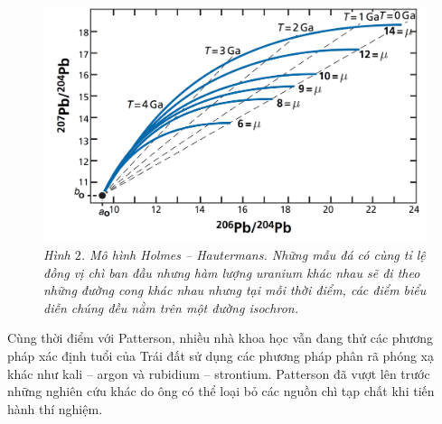 \begin{multicols}{2}
	\begin{figure}[H]
		\vspace*{-5pt}
		\centering
		\captionsetup{labelformat= empty, justification=centering}
		\includegraphics[width= 1\linewidth]{2}
		\caption{\small\textit{\color{timhieukhoahoc}Hình $2$. Mô hình Holmes -- Hautermans. Những mẫu đá có cùng tỉ lệ đồng vị chì ban đầu nhưng hàm lượng uranium khác nhau sẽ đi theo những đường cong khác nhau nhưng tại mỗi thời điểm, các điểm biểu diễn chúng đều nằm trên một đường isochron.}}
	\end{figure}	
	Cùng thời điểm với Patterson, nhiều nhà khoa học vẫn đang thử các phương pháp xác định tuổi của Trái đất sử dụng các phương pháp phân rã phóng xạ khác như kali -- argon và rubidium -- strontium. Patterson đã vượt lên trước những nghiên cứu khác do ông có thể loại bỏ các nguồn chì tạp chất khi tiến hành thí nghiệm.
	\begin{figure}[H]
		\vspace*{-5pt}
		\centering
		\captionsetup{labelformat= empty, justification=centering}

\end{figure}
\end{multicols}

